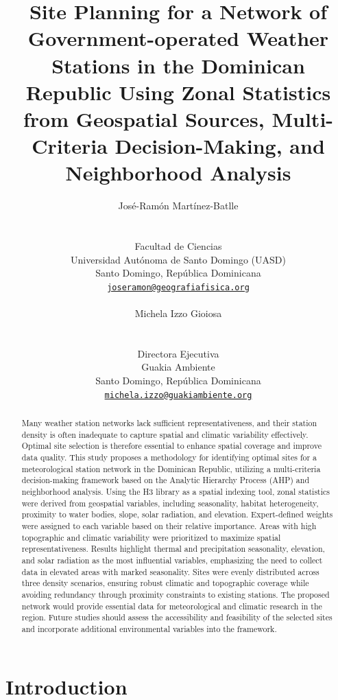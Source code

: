 \documentclass[spanish]{article}
\title{Site Planning for a Network of Government-operated Weather
Stations in the Dominican Republic Using Zonal Statistics from
Geospatial Sources, Multi-Criteria Decision-Making, and Neighborhood
Analysis}
\author{
    \parbox[t]{10cm}{\centering José-Ramón Martínez-Batlle \\ \orcidlink{0000-0001-9924-0327}}
   \\
    Facultad de Ciencias \\
    Universidad Autónoma de Santo Domingo (UASD) \\
  Santo Domingo, República Dominicana \\
  \texttt{\href{mailto:joseramon@geografiafisica.org}{\nolinkurl{joseramon@geografiafisica.org}}} \\
   \And
    \parbox[t]{10cm}{\centering Michela Izzo Gioiosa \\ \orcidlink{0000-0003-4835-3967}}
   \\
    Directora Ejecutiva \\
    Guakia Ambiente \\
  Santo Domingo, República Dominicana \\
  \texttt{\href{mailto:michela.izzo@guakiambiente.org}{\nolinkurl{michela.izzo@guakiambiente.org}}} \\
  }
\begin{document}
\maketitle




\begin{abstract}
Many weather station networks lack sufficient representativeness, and
their station density is often inadequate to capture spatial and
climatic variability effectively. Optimal site selection is therefore
essential to enhance spatial coverage and improve data quality. This
study proposes a methodology for identifying optimal sites for a
meteorological station network in the Dominican Republic, utilizing a
multi-criteria decision-making framework based on the Analytic Hierarchy
Process (AHP) and neighborhood analysis. Using the H3 library as a
spatial indexing tool, zonal statistics were derived from geospatial
variables, including seasonality, habitat heterogeneity, proximity to
water bodies, slope, solar radiation, and elevation. Expert-defined
weights were assigned to each variable based on their relative
importance. Areas with high topographic and climatic variability were
prioritized to maximize spatial representativeness. Results highlight
thermal and precipitation seasonality, elevation, and solar radiation as
the most influential variables, emphasizing the need to collect data in
elevated areas with marked seasonality. Sites were evenly distributed
across three density scenarios, ensuring robust climatic and topographic
coverage while avoiding redundancy through proximity constraints to
existing stations. The proposed network would provide essential data for
meteorological and climatic research in the region. Future studies
should assess the accessibility and feasibility of the selected sites
and incorporate additional environmental variables into the framework.
\end{abstract}


\hypertarget{introduction}{%
\section{Introduction}\label{introduction}}
\end{document}
